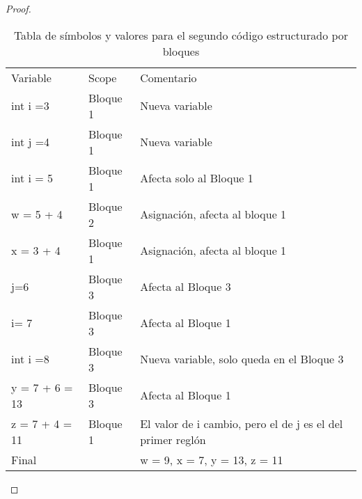\begin{proof}
\begin{table}[h!]
\centering
\begin{tabular}{lll}
Variable                    & Scope    & Comentario                                                 \\
int i =3                    & Bloque 1 & Nueva variable                                             \\
int j =4                    & Bloque 1 & Nueva variable                                             \\
int i = 5                   & Bloque 1 & Afecta solo al Bloque 1                                   \\
w = 5 + 4                   & Bloque 2 & Asignación, afecta al bloque 1                             \\ 
x = 3 + 4                   & Bloque 1 & Asignación, afecta al bloque 1                             \\ 
j=6                         & Bloque 3 & Afecta al Bloque 3                                         \\
i= 7                        & Bloque 3 & Afecta al Bloque 1                                         \\
int i =8                    & Bloque 3 & Nueva variable, solo queda en el Bloque 3                  \\
y = 7 + 6 = 13              & Bloque 3 & Afecta al Bloque 1                                         \\
z = 7 + 4 = 11              & Bloque 1 & El valor de i cambio, pero el de j es el del primer reglón \\
Final                       &          & w = 9, x = 7, y = 13, z = 11                             
\end{tabular}
\caption{Tabla de símbolos y valores para el segundo código estructurado por bloques}
\end{table}
\end{proof}
